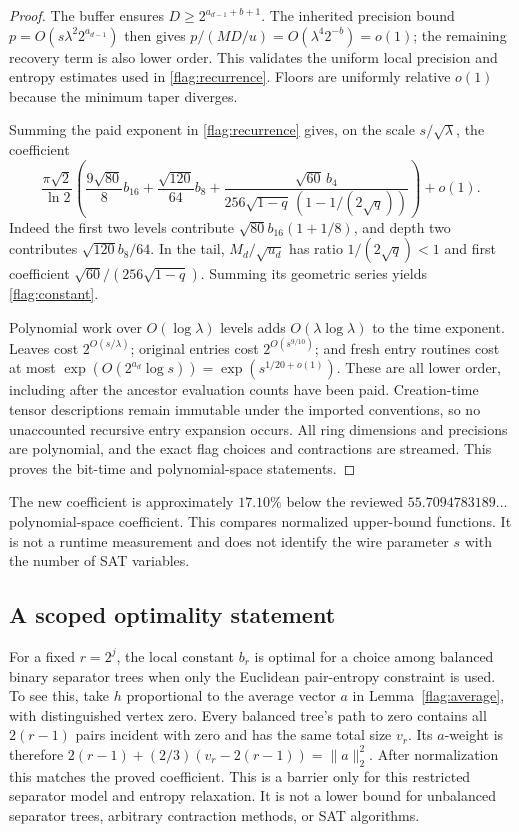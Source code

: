 \begin{proof}
The buffer ensures $D\ge2^{a_{d-1}+b+1}$. The inherited precision bound
$p=O(s\lambda^2 2^{a_{d-1}})$ then gives
$p/(MD/u)=O(\lambda^4 2^{-b})=o(1)$; the remaining recovery term is also
lower order. This validates the uniform local precision and entropy
estimates used in \eqref{flag:recurrence}. Floors are uniformly relative
$o(1)$ because the minimum taper diverges.

Summing the paid exponent in \eqref{flag:recurrence} gives, on the scale
$s/\sqrt\lambda$, the coefficient
\[
 \frac{\pi\sqrt2}{\ln2}
 \left(\frac{9\sqrt{80}}8 b_{16}
       +\frac{\sqrt{120}}{64}b_8
       +\frac{\sqrt{60}\,b_4}
        {256\sqrt{1-q}\,(1-1/(2\sqrt q))}\right)+o(1).
\]
Indeed the first two levels contribute
$\sqrt{80}b_{16}(1+1/8)$, and depth two contributes
$\sqrt{120}b_8/64$. In the tail, $M_d/\sqrt{u_d}$ has ratio
$1/(2\sqrt q)<1$ and first coefficient
$\sqrt{60}/(256\sqrt{1-q})$. Summing its geometric series yields
\eqref{flag:constant}.

Polynomial work over $O(\log\lambda)$ levels adds
$O(\lambda\log\lambda)$ to the time exponent. Leaves cost
$2^{O(s/\lambda)}$; original entries cost $2^{O(s^{9/10})}$; and fresh
entry routines cost at most
$\exp(O(2^{a_d}\log s))=\exp(s^{1/20+o(1)})$. These are all lower order,
including after the ancestor evaluation counts have been paid. Creation-time
tensor descriptions remain immutable under the imported conventions, so no
unaccounted recursive entry expansion occurs. All ring dimensions and
precisions are polynomial, and the exact flag choices and contractions are
streamed. This proves the bit-time and polynomial-space statements.
\end{proof}

The new coefficient is approximately $17.10\%$ below the reviewed
$55.7094783189\ldots$ polynomial-space coefficient. This compares normalized
upper-bound functions. It is not a runtime measurement and does not identify
the wire parameter $s$ with the number of SAT variables.

\subsection{A scoped optimality statement}

For a fixed $r=2^j$, the local constant $b_r$ is optimal for a choice among
balanced binary separator trees when only the Euclidean pair-entropy
constraint is used. To see this, take $h$ proportional to the average
vector $a$ in Lemma~\ref{flag:average}, with distinguished vertex zero.
Every balanced tree's path to zero contains all $2(r-1)$ pairs incident
with zero and has the same total size $v_r$. Its $a$-weight is therefore
$2(r-1)+(2/3)(v_r-2(r-1))=\|a\|_2^2$.
After normalization this matches the proved coefficient. This is a barrier
only for this restricted separator model and entropy relaxation. It is not
a lower bound for unbalanced separator trees, arbitrary contraction methods,
or SAT algorithms.
